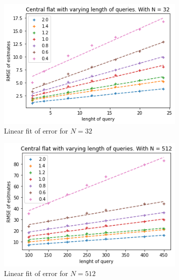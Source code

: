 \documentclass[11pt]{article}
\theoremstyle{definition}
\begin{document}
\begin{figure}[H]
\centering
\begin{subfigure}{.4\textwidth}
  \centering
  \includegraphics[width=\linewidth]{figures/central_flat/varying_r/cen_flat_varying_length_N_linear_=32.png}
  \caption{Linear fit of error for $N=32$}
  \label{fig:cen_r_sub1_lin}
\end{subfigure}%
\begin{subfigure}{.4\textwidth}
  \centering
  \includegraphics[width=\linewidth]{figures/central_flat/varying_r/cen_flat_varying_length_N_linear_=512.png}
  \caption{Linear fit of error for $N=512$}
  \label{fig:cen_r_sub2_lin}
\end{subfigure}
\begin{subfigure}{.4\textwidth}
  \centering

\end{subfigure}
\end{figure}
\end{document}
